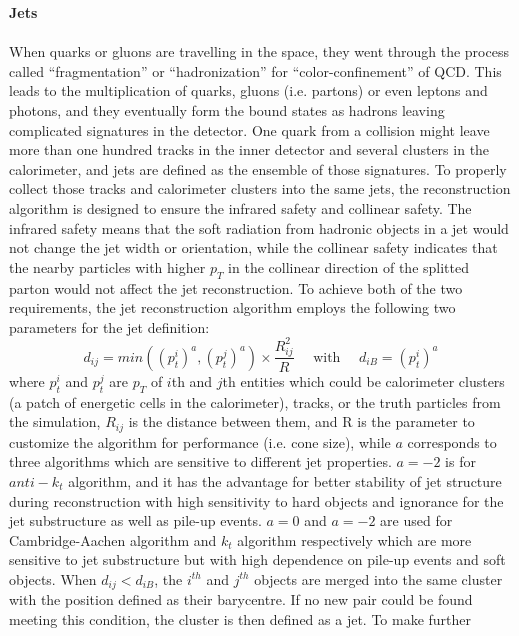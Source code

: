 \noindent
{\bf Jets}
\\
\\When quarks or gluons are travelling in the space, they went through the process called ``fragmentation'' or ``hadronization'' for ``color-confinement'' of QCD. This leads to the multiplication of quarks, gluons (i.e. partons) or even leptons and photons, and they eventually form the bound states as hadrons leaving complicated signatures in the detector. One quark from a collision might leave more than one hundred tracks in the inner detector and several clusters in the calorimeter, and jets are defined as the ensemble of those signatures. To properly collect those tracks and calorimeter clusters into the same jets, the reconstruction algorithm is designed to ensure the infrared safety and collinear safety. The infrared safety means that 
the soft radiation from hadronic objects in a jet would not change the jet width or orientation, while the collinear safety indicates that the nearby particles with higher $p_{T}$ in the collinear direction of the splitted parton would not affect the jet reconstruction. To achieve both of the two requirements, the jet reconstruction algorithm\cite{Atkin:2015msa} employs the following two parameters for the jet definition: 
\begin{equation}
d_{ij}=min((p_{t}^{i})^{a},(p_{t}^{j})^{a})\times \frac{R_{ij}^{2}}{R}
\quad \text{ with } \quad
d_{iB}=(p_{t}^{i})^{a}
\end{equation}
where $p_{t}^{i}$ and $p_{t}^{j}$ are $p_{T}$ of $i$th and $j$th entities which could be calorimeter clusters (a patch of energetic cells in the calorimeter), tracks, or the truth particles from the simulation, $R_{ij}$ is the distance between them, and R is the parameter to customize the algorithm for performance (i.e. cone size), while $a$ corresponds to three algorithms which are sensitive to different jet properties. $a=-2$ is for $anti-k_{t}$ algorithm, and it has the advantage for better stability of jet structure during reconstruction with high sensitivity to hard objects and ignorance for the jet substructure as well as pile-up events. $a=0$ and $a=-2$ are used for Cambridge-Aachen algorithm and $k_{t}$ algorithm respectively which are more sensitive to jet substructure but with high dependence on pile-up events and soft objects. When $d_{ij}<d_{iB}$, the $i^{th}$ and $j^{th}$ objects are merged into the same cluster with the position defined as their barycentre. If no new pair could be found meeting this condition, the cluster is then defined as a jet. To make further 
